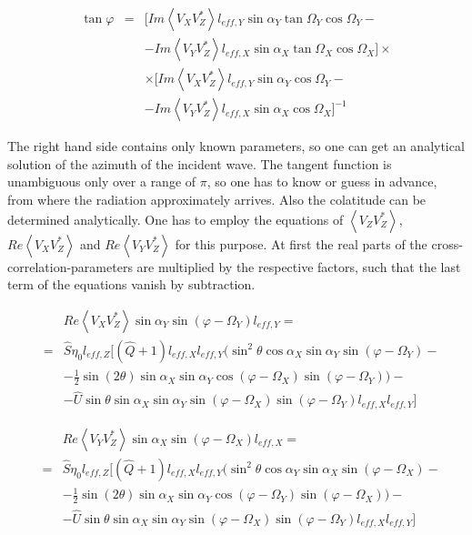 \documentclass[a4paper,11pt]{report}
\begin{document}
\begin{eqnarray}\label{tan_phi}
\tan \varphi &=& [Im \left\langle V_X V_Z^{*}\right\rangle l_{eff,Y} \sin \alpha_Y \tan \Omega_Y \cos \Omega_Y-\\
& & -Im \left\langle V_Y V_Z^{*}\right\rangle l_{eff,X} \sin \alpha_X \tan \Omega_X \cos \Omega_X] \times \nonumber \\
& &\times[Im \left\langle V_X V_Z^{*}\right\rangle l_{eff,Y} \sin \alpha_Y \cos \Omega_Y -\nonumber \\
& &  -Im \left\langle V_Y V_Z^{*}\right\rangle l_{eff,X} \sin \alpha_X  \cos \Omega_X]^{-1}\nonumber
\end{eqnarray}

The right hand side contains only known parameters, so one can get an analytical solution of the azimuth of the incident wave. The tangent function is unambiguous only over a range of $\pi$, so one has to know or guess in advance, from where the radiation approximately arrives. Also the colatitude can be determined analytically. One has to employ the equations of $\left\langle V_Z V_Z^{*} \right\rangle$, $Re \left\langle V_X V_Z^{*}\right\rangle$ and $Re \left\langle V_Y V_Z^{*}\right\rangle$ for this purpose. At first the real parts of the cross-correlation-parameters are multiplied by the respective factors, such that the last term of the equations vanish by subtraction.

\begin{eqnarray}
&&Re \left\langle V_X V_Z^{*}\right\rangle \sin \alpha_Y  \sin (\varphi - \Omega_Y)l_{eff,Y} = \\
&=& \hat{S}\eta_0  l_{eff,Z}[(\hat{Q}+1) l_{eff,X} l_{eff,Y}
(\sin^2 \theta \cos \alpha_X  \sin \alpha_Y  \sin (\varphi - \Omega_Y) - \nonumber \\
&& - \frac{1}{2}  \sin(2\theta) \sin \alpha_X  \sin \alpha_Y \cos(\varphi - \Omega_X)  \sin (\varphi - \Omega_Y) )  - \nonumber \\
&& -\hat{U} \sin \theta \sin \alpha_X  \sin \alpha_Y  \sin (\varphi - \Omega_X)  \sin (\varphi - \Omega_Y) l_{eff,X} l_{eff,Y}  ] \nonumber
\end{eqnarray}

\begin{eqnarray}
&&Re \left\langle V_Y V_Z^{*}\right\rangle\sin \alpha_X  \sin (\varphi - \Omega_X) l_{eff,X}=  \\
&=& \hat{S}\eta_0 l_{eff,Z}[(\hat{Q}+1)l_{eff,X} l_{eff,Y}  (\sin^2 \theta \cos \alpha_Y \sin \alpha_X  \sin (\varphi - \Omega_X) -\nonumber \\
&& - \frac{1}{2}  \sin(2\theta) \sin \alpha_X \sin \alpha_Y  \cos(\varphi - \Omega_Y)  \sin (\varphi - \Omega_X))  - \nonumber \\
&& -\hat{U} \sin \theta \sin \alpha_X \sin \alpha_Y  \sin (\varphi - \Omega_X) \sin (\varphi - \Omega_Y) l_{eff,X} l_{eff,Y}    ]\nonumber
\end{eqnarray}
\end{document}

